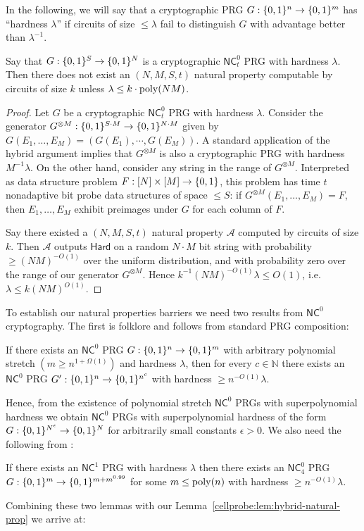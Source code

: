 In the following, we will say that a cryptographic PRG $G: \{0,1\}^n \to \{0,1\}^m$ has ``hardness $\lambda$'' if circuits of size $\leq \lambda$ fail to distinguish $G$ with advantage better than $\lambda^{-1}$. 
\begin{lemma}\label{cellprobe:lem:hybrid-natural-prop}
Say that $G: \{0,1\}^S \to \{0,1\}^N$ is a cryptographic $\mathsf{NC}^0_t$ PRG with hardness $\lambda$. Then there does not exist an $(N,M,S,t)$ natural property computable by circuits of size $k$ unless $\lambda \leq k \cdot \mathrm{poly}(NM) $.
\end{lemma}
\begin{proof}
Let $G$ be  a cryptographic $\mathsf{NC}^0_t$ PRG with hardness $\lambda$. Consider the generator $G^{\otimes M}: \{0,1\}^{S\cdot M} \to \{0,1\}^{N \cdot M}$ given by $G(E_1,\ldots,E_M) = (G(E_1),\cdots, G(E_M))$. A standard application of the hybrid argument implies that $G^{\otimes M}$ is also a cryptographic PRG with hardness $M^{-1}\lambda$. On the other hand, consider any string in the range of $G^{\otimes M}$. Interpreted as data structure problem $F:[N] \times [M] \to \{0,1\}$, this problem has time $t$ nonadaptive bit probe data structures of space $\leq S$: if $G^{\otimes M}(E_1,\ldots,E_M)= F$, then $E_1,\ldots,E_M$ exhibit preimages under $G$ for each column of $F$.

Say there existed a $(N,M,S,t)$ natural property $\mathcal{A}$ computed by circuits of size $k$. Then $\mathcal{A}$ outputs $\mathsf{Hard}$ on a random $N\cdot M$ bit string with probability $\geq (NM)^{-O(1)}$ over the uniform distribution, and with probability zero over the range of our generator $G^{\otimes M}$. Hence $k^{-1}(NM)^{-O(1)} \lambda \leq O(1)$, i.e. $\lambda \leq k(NM)^{O(1)}$.
\end{proof}
To establish our natural properties barriers we need two results from $\mathsf{NC}^0$ cryptography. The first is folklore and follows from standard PRG composition:
\begin{lemma}
If there exists an $\mathsf{NC}^0$ PRG $G: \{0,1\}^n \to \{0,1\}^{m}$ with arbitrary polynomial stretch $(m \geq n^{1 + \Omega(1)})$ and hardness $\lambda$, then for every $c \in \mathbb{N}$ there exists an $\mathsf{NC}^0$ PRG $G': \{0,1\}^n \to \{0,1\}^{n^c}$ with hardness $ \geq n^{-O(1)}\lambda$.
\end{lemma}
Hence, from the existence of polynomial stretch $\mathsf{NC}^0$ PRGs with superpolynomial hardness we obtain $\mathsf{NC}^0$ PRGs with superpolynomial hardness of the form $G: \{0,1\}^{N^\epsilon} \to \{0,1\}^N$ for arbitrarily small constants $\epsilon>0$. 
We also need the following from \cite{randomized-encodings}:
\begin{lemma}
If there exists an $\mathsf{NC}^1$ PRG with hardness $\lambda$ then there exists an $\mathsf{NC}_4^0$ PRG $G: \{0,1\}^m \to \{0,1\}^{m + m^{0.99}}$ for some $m \leq \mathrm{poly}(n)$ with hardness $\geq n^{-O(1)}\lambda$.
\end{lemma}
Combining these two lemmas with our Lemma~\ref{cellprobe:lem:hybrid-natural-prop} we arrive at:

